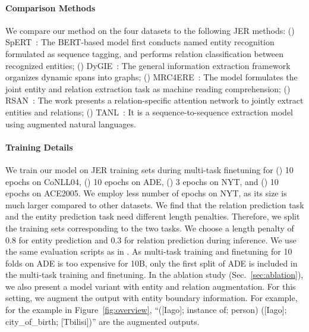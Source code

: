 \paragraph{Comparison Methods}
We compare our method \method on the four datasets to the following JER methods: (\expandafter{}) SpERT~\cite{DBLP:journals/corr/abs-1909-07755}: The BERT-based model first conducts named entity recognition formulated as sequence tagging, and performs relation classification between recognized entities; (\expandafter{}) DyGIE~\cite{luan2019general}: The general information extraction framework organizes dynamic spans into graphs; (\expandafter{}) MRC4ERE~\cite{zhao-etal-2020-asking}: The model formulates the joint entity and relation extraction task as machine reading comprehension; (\expandafter{}) RSAN~\cite{yuan2020relation}: The work presents a relation-specific attention network to jointly extract entities and relations; (\expandafter{}) TANL~\cite{paolini2021structured}: It is a sequence-to-sequence extraction model using augmented natural languages.

\paragraph{Training Details}
We train our model on JER training sets during multi-task finetuning for (\expandafter{}) 10 epochs on CoNLL04, (\expandafter{}) 10 epochs on ADE, (\expandafter{}) 3 epochs on NYT, and (\expandafter{}) 10 epochs on ACE2005. We employ less number of epochs on NYT, as its size is much larger compared to other datasets. We find that the relation prediction task and the entity prediction task need different length penalties. Therefore, we split the training sets corresponding to the two tasks. We choose a length penalty of 0.8 for entity prediction and 0.3 for relation prediction during inference. We use the same evaluation scripts as in \cite{paolini2021structured}. As multi-task training and finetuning for 10 folds on ADE is too expensive for \method 10B, only the first split of ADE is included in the multi-task training and finetuning.
In the ablation study (Sec.~\ref{sec:ablation}), we also present a model variant with entity and relation augmentation. For this setting, we augment the output with entity boundary information. For example, for the example in Figure~\ref{fig:overview}, ``([Iago]; instance of; person) ([Iago]; city\_of\_birth; [Tbilisi])'' are the augmented outputs. 

